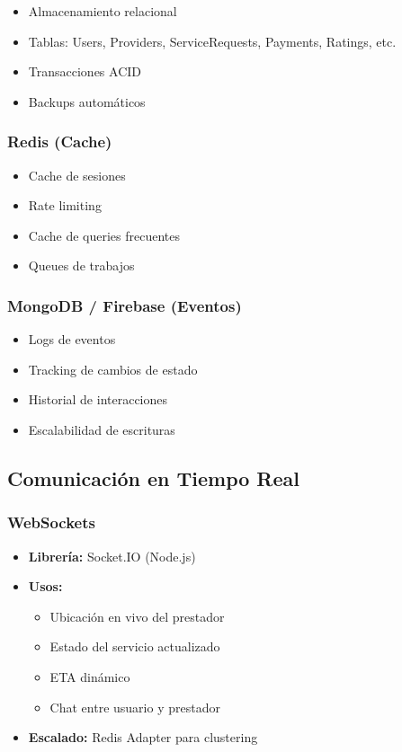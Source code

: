 \documentclass[12pt,a4paper,spanish]{article}
\begin{document}
\begin{itemize}
    \item Almacenamiento relacional
    \item Tablas: Users, Providers, ServiceRequests, Payments, Ratings, etc.
    \item Transacciones ACID
    \item Backups automáticos
\end{itemize}

\subsubsection{Redis (Cache)}

\begin{itemize}
    \item Cache de sesiones
    \item Rate limiting
    \item Cache de queries frecuentes
    \item Queues de trabajos
\end{itemize}

\subsubsection{MongoDB / Firebase (Eventos)}

\begin{itemize}
    \item Logs de eventos
    \item Tracking de cambios de estado
    \item Historial de interacciones
    \item Escalabilidad de escrituras
\end{itemize}

\subsection{Comunicación en Tiempo Real}

\subsubsection{WebSockets}

\begin{itemize}
    \item \textbf{Librería:} Socket.IO (Node.js)
    \item \textbf{Usos:}
    \begin{itemize}
        \item Ubicación en vivo del prestador
        \item Estado del servicio actualizado
        \item ETA dinámico
        \item Chat entre usuario y prestador
    \end{itemize}
    \item \textbf{Escalado:} Redis Adapter para clustering
\end{itemize}
\end{document}

